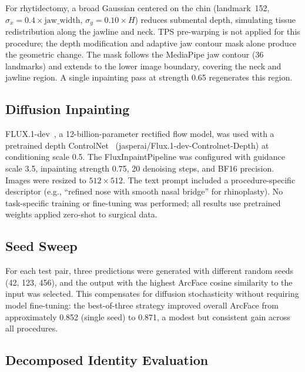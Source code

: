 \documentclass[runningheads]{llncs}
\begin{document}
For rhytidectomy, a broad Gaussian centered on the chin
(landmark~152, $\sigma_x = 0.4 \times \text{jaw\_width}$,
$\sigma_y = 0.10 \times H$) reduces submental depth, simulating
tissue redistribution along the jawline and neck. TPS pre-warping is
not applied for this procedure; the depth modification and adaptive
jaw contour mask alone produce the geometric change. The mask follows
the MediaPipe jaw contour (36 landmarks) and extends to the lower
image boundary, covering the neck and jawline region. A single
inpainting pass at strength 0.65 regenerates this region.

\subsection{Diffusion Inpainting}

FLUX.1-dev~\cite{flux2024}, a 12-billion-parameter rectified flow
model, was used with a pretrained depth
ControlNet~\cite{zhang2023controlnet} (jasperai/Flux.1-dev-Controlnet-Depth)
at conditioning scale 0.5. The FluxInpaintPipeline was configured with
guidance scale 3.5, inpainting strength 0.75, 20 denoising steps, and
BF16 precision. Images were resized to $512 \times 512$. The text prompt
included a procedure-specific descriptor (e.g., ``refined nose with
smooth nasal bridge'' for rhinoplasty). No task-specific training or
fine-tuning was performed; all results use pretrained weights applied
zero-shot to surgical data.

\subsection{Seed Sweep}

For each test pair, three predictions were generated with different
random seeds (42, 123, 456), and the output with the highest ArcFace
cosine similarity to the input was selected. This compensates for
diffusion stochasticity without requiring model fine-tuning: the
best-of-three strategy improved overall ArcFace from approximately
0.852 (single seed) to 0.871, a modest but consistent gain across
all procedures.

\subsection{Decomposed Identity Evaluation}
\end{document}

